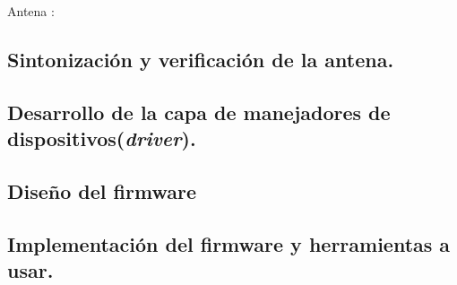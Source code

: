 		


%

Antena :
\subsection{Sintonización y verificación de la antena.}

\subsection{Desarrollo de la capa de manejadores de dispositivos(\textit{driver}).}

\subsection{Diseño del firmware}

\subsection{Implementación del firmware  y herramientas a usar.}


